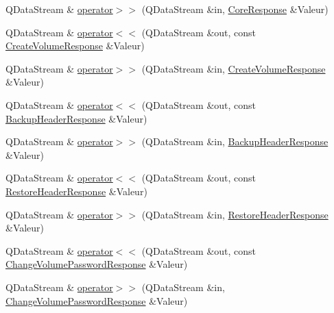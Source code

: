 \begin{DoxyCompactItemize}
\item 
Q\+Data\+Stream \& \hyperlink{namespace_gost_crypt_1_1_core_a6ae08cb8ec68babaaa0e43ce9b5a965c}{operator$>$$>$} (Q\+Data\+Stream \&in, \hyperlink{struct_gost_crypt_1_1_core_1_1_core_response}{Core\+Response} \&Valeur)
\item 
Q\+Data\+Stream \& \hyperlink{namespace_gost_crypt_1_1_core_ae79ccf0215c9beb4e8ef84f76a54653d}{operator$<$$<$} (Q\+Data\+Stream \&out, const \hyperlink{struct_gost_crypt_1_1_core_1_1_create_volume_response}{Create\+Volume\+Response} \&Valeur)
\item 
Q\+Data\+Stream \& \hyperlink{namespace_gost_crypt_1_1_core_a55c580188398414943833a3325b55418}{operator$>$$>$} (Q\+Data\+Stream \&in, \hyperlink{struct_gost_crypt_1_1_core_1_1_create_volume_response}{Create\+Volume\+Response} \&Valeur)
\item 
Q\+Data\+Stream \& \hyperlink{namespace_gost_crypt_1_1_core_a561fc2fc1534f1254f00853cb817f353}{operator$<$$<$} (Q\+Data\+Stream \&out, const \hyperlink{struct_gost_crypt_1_1_core_1_1_backup_header_response}{Backup\+Header\+Response} \&Valeur)
\item 
Q\+Data\+Stream \& \hyperlink{namespace_gost_crypt_1_1_core_a832925d667b756b0c8bf4189ec9c9264}{operator$>$$>$} (Q\+Data\+Stream \&in, \hyperlink{struct_gost_crypt_1_1_core_1_1_backup_header_response}{Backup\+Header\+Response} \&Valeur)
\item 
Q\+Data\+Stream \& \hyperlink{namespace_gost_crypt_1_1_core_a895b7f5d0e21d951476ebe909aadcc10}{operator$<$$<$} (Q\+Data\+Stream \&out, const \hyperlink{struct_gost_crypt_1_1_core_1_1_restore_header_response}{Restore\+Header\+Response} \&Valeur)
\item 
Q\+Data\+Stream \& \hyperlink{namespace_gost_crypt_1_1_core_a3088e9a1e627d976f09bc06d868e9795}{operator$>$$>$} (Q\+Data\+Stream \&in, \hyperlink{struct_gost_crypt_1_1_core_1_1_restore_header_response}{Restore\+Header\+Response} \&Valeur)
\item 
Q\+Data\+Stream \& \hyperlink{namespace_gost_crypt_1_1_core_a5476ecdbbb339687a3a88652e8821ebc}{operator$<$$<$} (Q\+Data\+Stream \&out, const \hyperlink{struct_gost_crypt_1_1_core_1_1_change_volume_password_response}{Change\+Volume\+Password\+Response} \&Valeur)
\item 
Q\+Data\+Stream \& \hyperlink{namespace_gost_crypt_1_1_core_a8551d6cdab3d0483a76d9d1882b538ad}{operator$>$$>$} (Q\+Data\+Stream \&in, \hyperlink{struct_gost_crypt_1_1_core_1_1_change_volume_password_response}{Change\+Volume\+Password\+Response} \&Valeur)
\item 

\end{DoxyCompactItemize}

